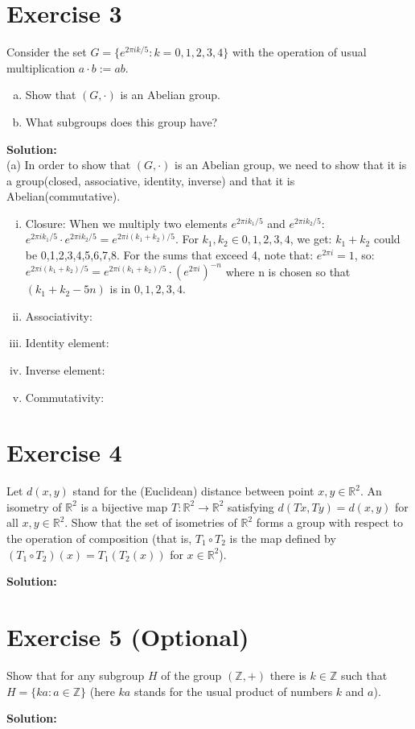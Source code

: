 \documentclass{article}
\begin{document}
\newpage

\section*{Exercise 3}

Consider the set $G=\{e^{2\pi i k/5} : k=0,1,2,3,4\}$ with the operation of usual multiplication $a \cdot b := ab$.
\begin{enumerate}[(a)]
\item Show that $(G,\cdot)$ is an Abelian group.
\item What subgroups does this group have?
\end{enumerate}

\textbf{Solution:}\\

(a) In order to show that $(G,\cdot)$ is an Abelian group, we need to show that it is a group(closed, associative, identity, inverse) and that it is Abelian(commutative).

\begin{enumerate}[(i)]
\item Closure: When we multiply two elements $e^{2\pi i k_1/5}$ and $e^{2\pi i k_2/5}$:
$e^{2\pi i k_1/5} \cdot e^{2\pi i k_2/5} = e^{2\pi i(k_1 + k_2)/5}$.
For $k_1, k_2 \in {0,1,2,3,4}$, we get:
$k_1 + k_2$ could be 0,1,2,3,4,5,6,7,8.
For the sums that exceed 4, note that:
$e^{2\pi i} = 1$, so:
$e^{2\pi i(k_1 + k_2)/5} = e^{2\pi i(k_1 + k_2)/5} \cdot (e^{2\pi i})^{-n}$ where n is chosen so that $(k_1 + k_2 - 5n)$ is in ${0,1,2,3,4}$.

\item Associativity:

\item Identity element:

\item Inverse element:

\item Commutativity:

\end{enumerate}

\newpage

\section*{Exercise 4}

Let $d(x,y)$ stand for the (Euclidean) distance between point $x,y \in \mathbb{R}^2$. An isometry of $\mathbb{R}^2$ is a bijective map $T: \mathbb{R}^2 \to \mathbb{R}^2$ satisfying $d(Tx,Ty)=d(x,y)$ for all $x,y \in \mathbb{R}^2$. Show that the set of isometries of $\mathbb{R}^2$ forms a group with respect to the operation of composition (that is, $T_1 \circ T_2$ is the map defined by $(T_1 \circ T_2)(x)=T_1(T_2(x))$ for $x \in \mathbb{R}^2$).

\textbf{Solution:}

\newpage

\section*{Exercise 5 (Optional)}

Show that for any subgroup $H$ of the group $(\mathbb{Z},+)$ there is $k \in \mathbb{Z}$ such that $H=\{ka : a \in \mathbb{Z}\}$ (here $ka$ stands for the usual product of numbers $k$ and $a$).

\textbf{Solution:}
\end{document}
